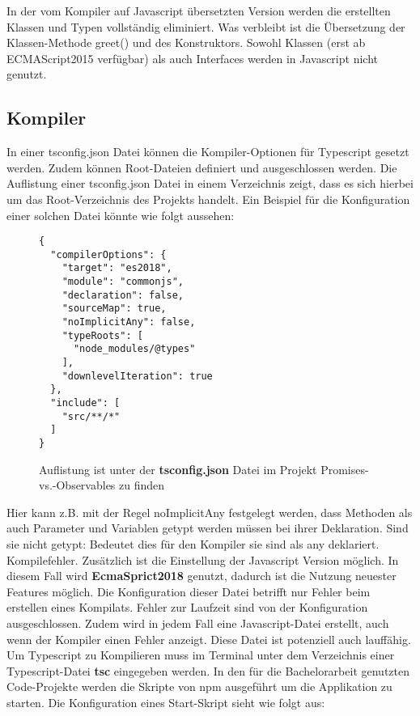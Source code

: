 \noindent
In der vom Kompiler auf Javascript übersetzten Version werden die erstellten Klassen und Typen vollständig eliminiert. Was verbleibt ist die Übersetzung der Klassen-Methode greet() und des Konstruktors. Sowohl Klassen (erst ab ECMAScript2015 verfügbar) als auch Interfaces werden in Javascript nicht genutzt.

\subsection{Kompiler}

In einer tsconfig.json Datei können die Kompiler-Optionen für Typescript gesetzt werden. Zudem können Root-Dateien definiert und ausgeschlossen werden. Die Auflistung einer tsconfig.json Datei in einem Verzeichnis zeigt, dass es sich hierbei um das Root-Verzeichnis des Projekts handelt. Ein Beispiel für die Konfiguration einer solchen Datei könnte wie folgt aussehen: 

\begin{figure}[H]
\begin{lstlisting}
{
  "compilerOptions": {
    "target": "es2018",
    "module": "commonjs",
    "declaration": false,
    "sourceMap": true,
    "noImplicitAny": false,
    "typeRoots": [
      "node_modules/@types"
    ],
    "downlevelIteration": true
  },
  "include": [
    "src/**/*"
  ]
} 
\end{lstlisting}
\caption{Auflistung ist unter der \textbf{tsconfig.json} Datei im Projekt Promises-vs.-Observables zu finden}
\end{figure}

\noindent
Hier kann z.B. mit der Regel \glqq noImplicitAny\grqq{} festgelegt werden, dass Methoden als auch Parameter und Variablen getypt werden müssen bei ihrer Deklaration. Sind sie nicht getypt: Bedeutet dies für den Kompiler sie sind als any deklariert. Kompilefehler.\cite{tsconfig} Zusätzlich ist die Einstellung der Javascript Version möglich. In diesem Fall wird \textbf{EcmaSprict2018} genutzt, dadurch ist die Nutzung neuester Features möglich. Die Konfiguration dieser Datei betrifft nur Fehler beim erstellen eines Kompilats. Fehler zur Laufzeit sind von der Konfiguration ausgeschlossen. Zudem wird in jedem Fall eine Javascript-Datei erstellt, auch wenn der Kompiler einen Fehler anzeigt. Diese Datei ist potenziell auch lauffähig. Um Typescript zu Kompilieren muss im Terminal unter dem Verzeichnis einer Typescript-Datei \textbf{tsc} eingegeben werden. In den für die Bachelorarbeit genutzten Code-Projekte werden die Skripte von npm ausgeführt um die Applikation zu starten. Die Konfiguration eines Start-Skript sieht wie folgt aus:

